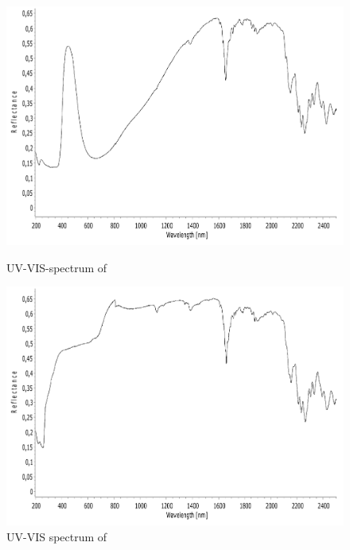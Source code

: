 \begin{figure}[!htpb]
\centering
\includegraphics[scale=0.43]{figures/CuD4MOP-VIS.pdf}
\caption*{UV-VIS-spectrum of }
\label{fig:CuD4MOP_vis}
\includegraphics[scale=0.43]{figures/ZnD4MOP-VIS.pdf}
\caption*{UV-VIS spectrum of }
\label{fig:ZnD4MOP_vis}
\end{figure}

